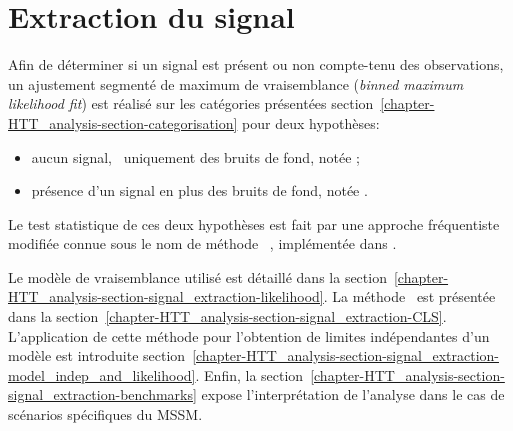 \section{Extraction du signal}\label{chapter-HTT_analysis-section-signal_extraction}
Afin de déterminer si un signal est présent ou non compte-tenu des observations,
un ajustement segmenté de maximum de vraisemblance (\emph{binned maximum likelihood fit}) est réalisé sur les catégories présentées section~\ref{chapter-HTT_analysis-section-categorisation} pour deux hypothèses:
\begin{itemize}
\item aucun signal, \ie\ uniquement des bruits de fond, notée \hypB;
\item présence d'un signal en plus des bruits de fond, notée \hypSB.
\end{itemize}
Le test statistique de ces deux hypothèses est fait par une approche fréquentiste modifiée connue sous le nom de méthode \CLS~\cite{Junk:1999kv,CLs_method,Read_2002}, implémentée dans \COMBINE.
\par
Le modèle de vraisemblance utilisé est détaillé dans la section~\ref{chapter-HTT_analysis-section-signal_extraction-likelihood}.
La méthode \CLS\ est présentée dans la section~\ref{chapter-HTT_analysis-section-signal_extraction-CLS}.
L'application de cette méthode pour l'obtention de limites indépendantes d'un modèle est introduite section~\ref{chapter-HTT_analysis-section-signal_extraction-model_indep_and_likelihood}.
Enfin, la section~\ref{chapter-HTT_analysis-section-signal_extraction-benchmarks} expose l'interprétation de l'analyse dans le cas de scénarios spécifiques du MSSM.



